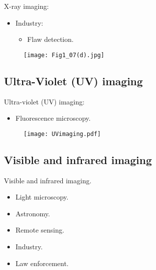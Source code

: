 
\begin{frame}
X-ray imaging:
\begin{itemize}
\item Industry:
\begin{itemize}
\item Flaw detection.
\end{itemize}
\end{itemize}
\begin{figure}
\texttt{[image: Fig1\_07(d).jpg]}
\end{figure}
\end{frame}


\subsection*{Ultra-Violet (UV) imaging}


\begin{frame}
Ultra-violet (UV) imaging:
\begin{itemize}
\item Fluorescence microscopy.
\end{itemize}
\begin{figure}
\texttt{[image: UVimaging.pdf]}
\end{figure}
\end{frame}


\subsection*{Visible and infrared imaging}


\begin{frame}
Visible and infrared imaging.
\begin{itemize}
\item Light microscopy.
\item Astronomy.
\item Remote sensing.
\item Industry.
\item Law enforcement.
\end{itemize}
\end{frame}

